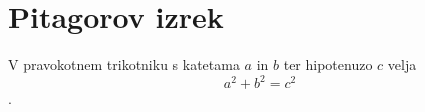 \documentclass{article}
\begin{document}
\section*{Pitagorov izrek}
V pravokotnem trikotniku s katetama \(a\) in \(b\) ter hipotenuzo \(c\) velja
\[ a^2 + b^2 = c^2 \].
\end{document}
